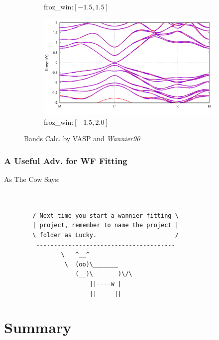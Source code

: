 \documentclass{beamer}
\begin{document}
\begin{frame}
\begin{figure}
\begin{subfigure}{0.42\textwidth}
         \caption{{\small froz\_win:\([-1.5,1.5]\)}}
      \end{subfigure}
      \begin{subfigure}{0.42\textwidth}
         \centering
         \includegraphics[width=\textwidth]{figure/Band_-1-5_to_2-0.png}
         \caption{{\small froz\_win:\([-1.5,2.0]\)}}
      \end{subfigure}
        \caption{Bands Calc. by VASP and \emph{Wannier90}}
    \end{figure}

  \end{frame}

  \begin{frame}[fragile]
    \frametitle{A Useful Adv. for WF Fitting}
    \begin{block}{As The Cow Says:}
      \begin{verbatim}

         _______________________________________
        / Next time you start a wannier fitting \
        | project, remember to name the project |
        \ folder as Lucky.                      /
         ---------------------------------------
                \   ^__^
                 \  (oo)\_______
                    (__)\       )\/\
                        ||----w |
                        ||     ||
     \end{verbatim}
    \end{block}
  \end{frame}

  \section{Summary}
\end{document}
